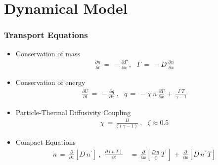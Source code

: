 \documentclass[10pt]{beamer}
\begin{document}
\section{Dynamical Model}
\begin{frame} %
\frametitle{Transport Equations}
\begin{itemize}
	\item Conservation of mass
\begin{align} %
	\frac{\partial n}{\partial t} \,=\, -\frac{\partial \Gamma}{\partial x}~,
		~~~ \Gamma \,=\, -D \, \frac{\partial n}{\partial x}
		\label{eq:n_continuity}
\end{align}
	\item Conservation of energy
\begin{align} %
	\frac{\partial U}{\partial t} \,=\, -\frac{\partial q}{\partial x}~,~~~
		q \,=\, -\chi \, n \, \frac{\partial T}{\partial x} \,+\,
	\frac{\Gamma \, T}{\gamma - 1}
\end{align}
	\item Particle-Thermal Diffusivity Coupling
\begin{align} %
	\chi \,=\, \frac{D}{\zeta (\gamma - 1)}~,~~~ \zeta \approx 0.5
\end{align}
	\item Compact Equations
\begin{align} %
	\dot{n} \,=\, \frac{\partial}{\partial x} \left[D \, n^\prime\right]~,~~
	\frac{\partial(n\,T)}{\partial t} \,&=\, \frac{\partial}{\partial x}
		\left[\frac{D\,n}{\zeta} \, T^\prime\right]
		\,+\, \frac{\partial}{\partial x} \left[D\, n^\prime \, T \right]
		\label{eq:U_compact}
\end{align}
\end{itemize}
\end{frame}

\end{document}
